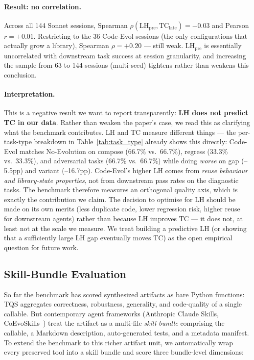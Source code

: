 \documentclass[sigplan,nonacm,natbib=false]{acmart}
\begin{document}
\paragraph{Result: no correlation.} Across all 144 Sonnet sessions, Spearman $\rho(\text{LH}_\text{pre}, \text{TC}_\text{late}) = -0.03$ and Pearson $r = +0.01$. Restricting to the 36 Code-Evol sessions (the only configurations that actually grow a library), Spearman $\rho = +0.20$ --- still weak. LH$_\text{pre}$ is essentially uncorrelated with downstream task success at session granularity, and increasing the sample from 63 to 144 sessions (multi-seed) tightens rather than weakens this conclusion.

\paragraph{Interpretation.} This is a negative result we want to report transparently: \textbf{LH does not predict TC in our data}. Rather than weaken the paper's case, we read this as clarifying what the benchmark contributes. LH and TC measure different things --- the per-task-type breakdown in Table~\ref{tab:task_type} already shows this directly: Code-Evol matches No-Evolution on compose (66.7\% vs.\ 66.7\%), regress (33.3\% vs.\ 33.3\%), and adversarial tasks (66.7\% vs.\ 66.7\%) while doing \emph{worse} on gap (--5.5pp) and variant (--16.7pp). Code-Evol's higher LH comes from \emph{reuse behaviour and library-state properties}, not from downstream pass rates on the diagnostic tasks. The benchmark therefore measures an orthogonal quality axis, which is exactly the contribution we claim. The decision to optimise for LH should be made on its own merits (less duplicate code, lower regression risk, higher reuse for downstream agents) rather than because LH improves TC --- it does not, at least not at the scale we measure. We treat building a predictive LH (or showing that a sufficiently large LH gap eventually moves TC) as the open empirical question for future work.

\subsection{Skill-Bundle Evaluation}
\label{sec:skill_eval}

So far the benchmark has scored synthesized artifacts as bare Python functions: TQS aggregates correctness, robustness, generality, and code-quality of a single callable. But contemporary agent frameworks (Anthropic Claude Skills, CoEvoSkills~\cite{zhang2026coevoskills}) treat the artifact as a multi-file \emph{skill bundle} comprising the callable, a Markdown description, auto-generated tests, and a metadata manifest. To extend the benchmark to this richer artifact unit, we automatically wrap every preserved tool into a skill bundle and score three bundle-level dimensions:
\end{document}
